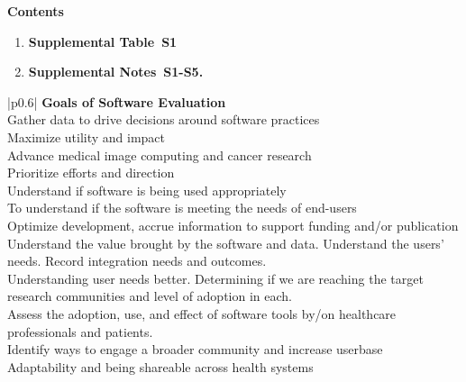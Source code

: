 \documentclass{article}
\begin{document}
\setcounter{figure}{0}
\setcounter{table}{0}
\setcounter{section}{0}
\setcounter{page}{1}
\makeatletter
\renewcommand{\thetable}{S\@arabic\c@table}
\renewcommand{\theHtable}{S\@arabic\c@table}
\renewcommand{\thesection}{S\@arabic\c@section}
\renewcommand{\theHsection}{S\@arabic\c@section}

\vspace*{1cm}

{\bf \large Contents}

\begin{enumerate}
    \item \textbf{Supplemental Table~S1}
    \item \textbf{Supplemental Notes~S1-S5.}
\end{enumerate}


\clearpage


\begin{table}[!ht]
 \caption{\textbf{Survey Responses.} A subset of responses to the question, "What would be your goals in evaluating the impact, engagement, or usage of a software tool?" }
  \centering
  \begin{tabular}{|p{}|}
    \hline
     { \textbf{Goals of Software Evaluation}}   \\
    \hline
     Gather data to drive decisions around software practices \\ \hline
    Maximize utility and impact \\
    \hline
    Advance medical image computing and cancer research \\
    \hline
    Prioritize efforts and direction \\
    \hline
    Understand if software is being used appropriately \\
    \hline
    To understand if the software is meeting the needs of end-users \\
    \hline
    Optimize development, accrue information to support funding and/or publication \\
    \hline
    Understand the value brought by the software and data. Understand the users' needs. Record integration needs and outcomes.\\
    \hline
    Understanding user needs better. Determining if we are reaching the target research communities and level of adoption in each. \\
    \hline
    Assess the adoption, use, and effect of software tools by/on healthcare professionals and patients. \\
    \hline
    Identify ways to engage a broader community and increase userbase\\
    \hline
    Adaptability and being shareable across health systems \\
    \hline
  \end{tabular}
  \label{tab:survey_table}
\end{table}
\end{document}
